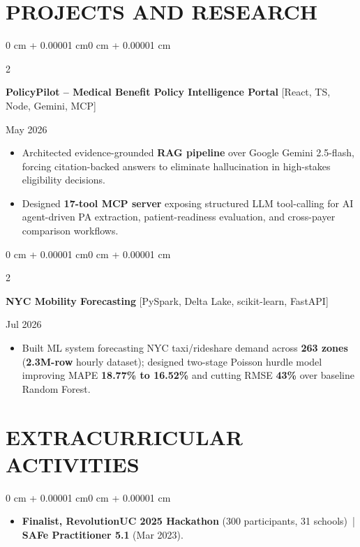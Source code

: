 \documentclass[10pt, letterpaper]{article}
\newenvironment{highlights}{
    \begin{itemize}[
        topsep=0.10 cm,
        parsep=0.06 cm,
        partopsep=0pt,
        itemsep=0.06 cm,
        leftmargin=12pt
    ]
}{
    \end{itemize}
}
\newenvironment{onecolentry}{
    \begin{adjustwidth}{0 cm + 0.00001 cm}{0 cm + 0.00001 cm}
}{
    \end{adjustwidth}
}
\newenvironment{twocolentry}[2][]{
    \onecolentry
    \def\secondColumn{#2}
    \setcolumnwidth{\fill, 4.5 cm}
    \begin{paracol}{2}
}{
    \switchcolumn \raggedleft \secondColumn
    \end{paracol}
    \endonecolentry
}
\begin{document}
\section{PROJECTS AND RESEARCH}
\begin{twocolentry}{May 2026}
\textbf{PolicyPilot -- Medical Benefit Policy Intelligence Portal} [React, TS, Node, Gemini, MCP]
\end{twocolentry}
\begin{highlights}
  \item Architected evidence-grounded \textbf{RAG pipeline} over Google Gemini 2.5-flash, forcing citation-backed answers to eliminate hallucination in high-stakes eligibility decisions.
  \item Designed \textbf{17-tool MCP server} exposing structured LLM tool-calling for AI agent-driven PA extraction, patient-readiness evaluation, and cross-payer comparison workflows.
\end{highlights}

\vspace{0.12 cm}

\begin{twocolentry}{Jul 2026}
\textbf{NYC Mobility Forecasting} [PySpark, Delta Lake, scikit-learn, FastAPI]
\end{twocolentry}
\begin{highlights}
  \item Built ML system forecasting NYC taxi/rideshare demand across \textbf{263 zones} (\textbf{2.3M-row} hourly dataset); designed two-stage Poisson hurdle model improving MAPE \textbf{18.77\% to 16.52\%} and cutting RMSE \textbf{43\%} over baseline Random Forest.
\end{highlights}

\section{EXTRACURRICULAR ACTIVITIES}
\begin{onecolentry}
\begin{highlights}
  \item \textbf{Finalist, RevolutionUC 2025 Hackathon} (300 participants, 31 schools) \,|\, \textbf{SAFe Practitioner 5.1} (Mar 2023).
\end{highlights}
\end{onecolentry}
\end{document}
